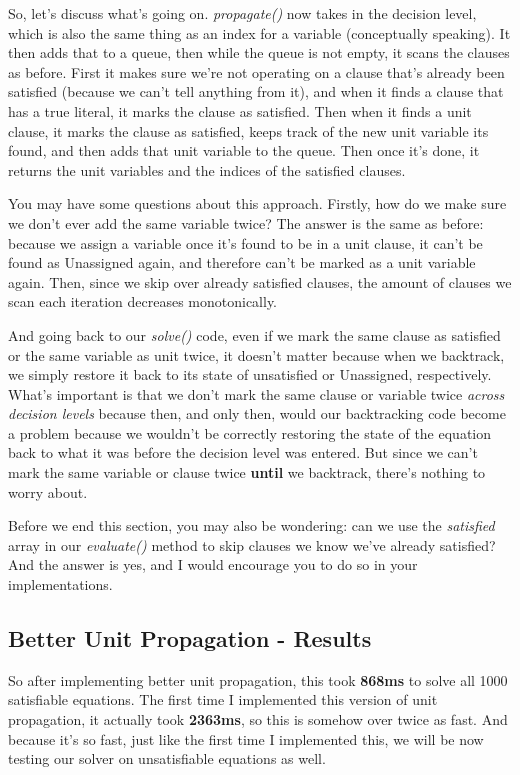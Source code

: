 \documentclass[oneside]{book}
\begin{document}
So, let's discuss what's going on. \textit{propagate()} now takes in the decision level, 
which is also the same thing as an index for a variable (conceptually speaking). It then 
adds that to a queue, then while the queue is not empty, it scans the clauses as before. 
First it makes sure we're not operating on a clause that's already been satisfied 
(because we can't tell anything from it), and when it finds a clause that has a true literal, 
it marks the clause as satisfied. Then when it finds a unit clause, it marks the clause as 
satisfied, keeps track of the new unit variable its found, and then adds that unit variable 
to the queue. Then once it's done, it returns the unit variables and the indices of the satisfied 
clauses.

You may have some questions about this approach. Firstly, how do we make sure we don't 
ever add the same variable twice? The answer is the same as before: because we assign a 
variable once it's found to be in a unit clause, it can't be found as Unassigned again, 
and therefore can't be marked as a unit variable again. Then, since we skip over already 
satisfied clauses, the amount of clauses we scan each iteration decreases monotonically. 

And going back to our \textit{solve()} code, even if we mark the same clause as satisfied 
or the same variable as unit twice, it doesn't matter because when we backtrack, we simply 
restore it back to its state of unsatisfied or Unassigned, respectively. What's important is 
that we don't mark the same clause or variable twice \textit{across decision levels} because 
then, and only then, would our backtracking code become a problem because we wouldn't be 
correctly restoring the state of the equation back to what it was before the decision level 
was entered. But since we can't mark the same variable or clause twice \textbf{until}
we backtrack, there's nothing to worry about.

Before we end this section, you may also be wondering: can we use the \textit{satisfied}
array in our \textit{evaluate()} method to skip clauses we know we've already satisfied?
And the answer is yes, and I would encourage you to do so in your implementations.

\subsection{Better Unit Propagation - Results}
So after implementing better unit propagation, this took \textbf{868ms} to solve all 1000 
satisfiable equations. The first time I implemented this version of unit propagation,
it actually took \textbf{2363ms}, so this is somehow over twice as fast. And because it's so 
fast, just like the first time I implemented this, we will be now testing our solver on 
unsatisfiable equations as well.
\end{document}
